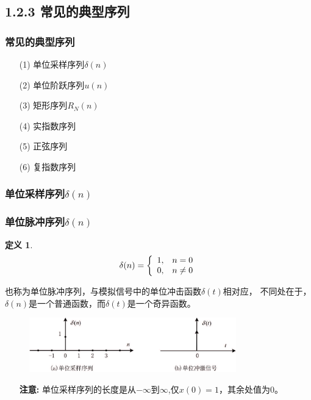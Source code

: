 \documentclass[notheorems,compress,mathserif,table]{beamer}
\newtheorem{definition}{定义}
\begin{document}
\subsection{1.2.3 常见的典型序列}
\begin{frame}\frametitle{常见的典型序列}%
\begin{enumerate}
  \item[(1)] 单位采样序列$\delta(n)$
  \item[(2)] 单位阶跃序列$u(n)$
  \item[(3)] 矩形序列$R_{N}(n)$
  \item[(4)] 实指数序列
  \item[(5)] 正弦序列
  \item[(6)] 复指数序列
\end{enumerate}
\end{frame}
%
%
%
%
%
%
\subsubsection*{单位采样序列$\delta(n)$}
\begin{frame}[shrink]\frametitle{单位脉冲序列$\delta(n)$}%
\begin{definition}
\begin{equation*}\label{fol:delta}
     \delta(n)= \left\{\begin{array}
     {r@{,\quad}l}
     1&\mbox{$n=0$}\\0&\mbox{$n\neq 0$}
    \end{array} \right.
\end{equation*}
\end{definition}
也称为单位脉冲序列，与模拟信号中的单位冲击函数$\delta(t)$相对应，
不同处在于，$\delta(n)$是一个普通函数，而$\delta(t)$是一个奇异函数。
\begin{figure}[h]
  \centering
  \includegraphics[width=0.8\textwidth]{danweicaiyang.jpg}
\end{figure}
\begin{itemize}
  \item [\textbf{注意:}]单位采样序列的长度是从$-\infty$到$\infty$,仅$x(0)=1$，其余处值为0。
\end{itemize}
\end{frame}
%
%
%
%
%
%
\end{document}
